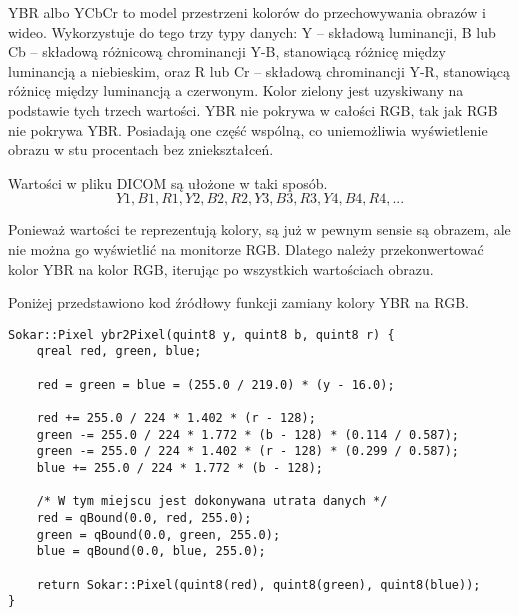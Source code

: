 \label{sec:algorithm-pixmap-ybr}

\par
YBR albo YCbCr to model przestrzeni kolorów do przechowywania obrazów i wideo.
Wykorzystuje do tego trzy typy danych: Y – składową luminancji, B lub Cb – składową różnicową chrominancji Y-B, stanowiącą różnicę między luminancją a niebieskim, oraz R lub Cr – składową chrominancji Y-R, stanowiącą różnicę między luminancją a czerwonym.
Kolor zielony jest uzyskiwany na podstawie tych trzech wartości.
YBR nie pokrywa w całości RGB, tak jak RGB nie pokrywa YBR.
Posiadają one część wspólną, co uniemożliwia wyświetlenie obrazu w stu procentach bez zniekształceń.

\par
Wartości w pliku DICOM są ułożone w taki sposób.
\[Y1, B1, R1, Y2, B2, R2, Y3, B3, R3, Y4, B4, R4,  ...\]

\par
Ponieważ wartości te reprezentują kolory, są już w pewnym sensie są obrazem, ale nie można go wyświetlić na monitorze RGB.
Dlatego należy przekonwertować kolor YBR na kolor RGB, iterując po wszystkich wartościach obrazu.

\par
Poniżej przedstawiono kod źródłowy funkcji zamiany kolory YBR na RGB.

\begin{lstlisting}
Sokar::Pixel ybr2Pixel(quint8 y, quint8 b, quint8 r) {
    qreal red, green, blue;

    red = green = blue = (255.0 / 219.0) * (y - 16.0);

    red += 255.0 / 224 * 1.402 * (r - 128);
    green -= 255.0 / 224 * 1.772 * (b - 128) * (0.114 / 0.587);
    green -= 255.0 / 224 * 1.402 * (r - 128) * (0.299 / 0.587);
    blue += 255.0 / 224 * 1.772 * (b - 128);

    /* W tym miejscu jest dokonywana utrata danych */
    red = qBound(0.0, red, 255.0);
    green = qBound(0.0, green, 255.0);
    blue = qBound(0.0, blue, 255.0);

    return Sokar::Pixel(quint8(red), quint8(green), quint8(blue));
}
\end{lstlisting}